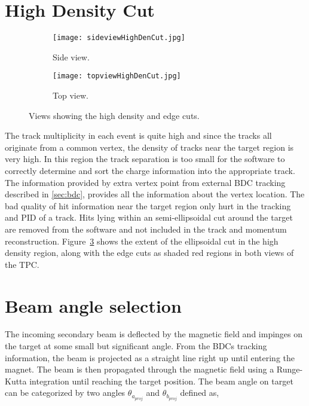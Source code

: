 \section{High Density Cut}


\begin{figure}[!htb]

     \centering
     \begin{subfigure}[b]{0.49\textwidth}
         \centering
         \texttt{[image: sideviewHighDenCut.jpg]}
         \caption{Side view.}
         \label{fig:sideHigh}
     \end{subfigure}
     \hfill
     \begin{subfigure}[b]{0.49\textwidth}
         \centering
         \texttt{[image: topviewHighDenCut.jpg]}
         \caption{Top view.}
         \label{fig:topHigh}
     \end{subfigure}
        \label{fig:highcut}
        \caption{Views showing the high density and edge cuts.}
        \label{fig:elipsecut}
\end{figure}
The track multiplicity in each event is quite high and since the tracks all originate from a common vertex, the density of tracks near the target region is very high. In this region the track separation is too small for the software to correctly determine and sort the charge information into the appropriate track. The information provided by extra vertex point from external BDC tracking described in \ref{sec:bdc}, provides all the information about the vertex location. The bad quality of hit information near the target region only hurt in the tracking and PID of a track. Hits lying within an semi-ellipsoidal cut around the target are removed from the software and not included in the track and momentum reconstruction. Figure~\ref{fig:elipsecut} shows the extent of the ellipsoidal cut in the high density region, along with the edge cuts as shaded red regions in both views of the TPC. 

\section{Beam angle selection}
\label{sec:beamangle}
The incoming secondary beam is deflected by the magnetic field and impinges on the target at some small but significant angle. From the BDCs tracking information, the beam is projected as a straight line right up until entering the magnet.  The beam is then propagated through the magnetic field using a Runge-Kutta integration until reaching the target position. The beam angle on target can be categorized by two angles $\theta_{a_{proj}}$ and $\theta_{b_{proj}}$ defined as, 

